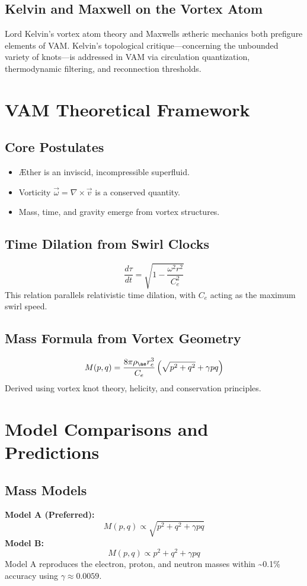 \documentclass[12pt]{article}
\begin{document}
    \subsection{Kelvin and Maxwell on the Vortex Atom}
    Lord Kelvin's vortex atom theory and Maxwell\rqs s ætheric mechanics both prefigure elements of VAM. Kelvin's topological critique—concerning the unbounded variety of knots—is addressed in VAM via circulation quantization, thermodynamic filtering, and reconnection thresholds.

    \section{VAM Theoretical Framework}
    \subsection{Core Postulates}
    \begin{itemize}
        \item Æther is an inviscid, incompressible superfluid.
        \item Vorticity \(\vec{\omega} = \nabla \times \vec{v}\) is a conserved quantity.
        \item Mass, time, and gravity emerge from vortex structures.
    \end{itemize}

    \subsection{Time Dilation from Swirl Clocks}
    \[
        \frac{d\tau}{dt} = \sqrt{1 - \frac{\omega^2 r^2}{C_e^2}}
    \]
    This relation parallels relativistic time dilation, with \(C_e\) acting as the maximum swirl speed.

    \subsection{Mass Formula from Vortex Geometry}
    \[
        M(p, q) = \frac{8 \pi \rho_{\ae} r_c^3}{C_e} \left( \sqrt{p^2 + q^2} + \gamma pq \right)
    \]
    Derived using vortex knot theory, helicity, and conservation principles.

    \section{Model Comparisons and Predictions}
    \subsection{Mass Models}
    \textbf{Model A (Preferred):}
    \[
        M(p, q) \propto \sqrt{p^2 + q^2 + \gamma pq}
    \]
    \textbf{Model B:}
    \[
        M(p, q) \propto p^2 + q^2 + \gamma pq
    \]
    Model A reproduces the electron, proton, and neutron masses within \textasciitilde0.1\% accuracy using \(\gamma \approx 0.0059\).
\end{document}
